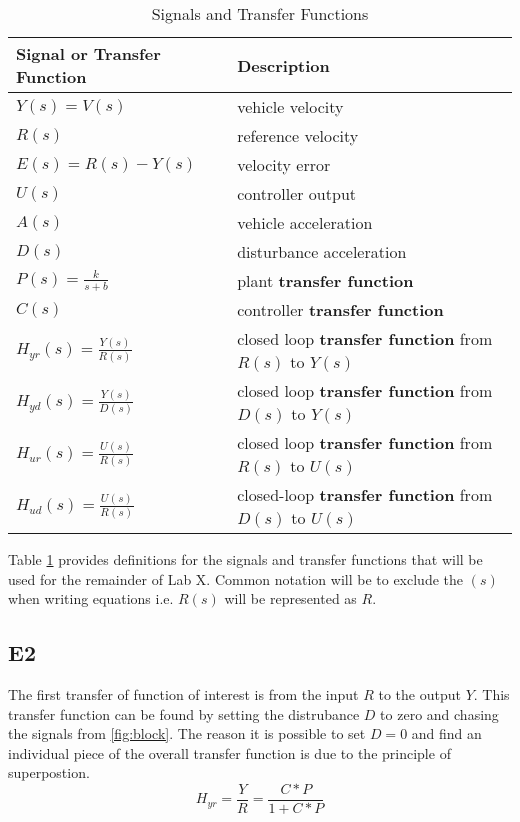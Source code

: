 \documentclass[11pt,titlepage]{article}
\begin{document}
	\begin{table}[!htb]
		\centering
		\begin{tabular}{|m{5cm}|m{9cm}|} 
		\hline
		Signal or Transfer Function & Description \\ 
		\hline
		$Y(s)=V(s)$ & vehicle velocity \\
		\hline
		$R(s)$ & reference velocity \\
		\hline
		$E(s)=R(s)-Y(s)$ & velocity error \\
		\hline
		$U(s)$ & controller output \\
		\hline
		$A(s)$ & vehicle acceleration \\
		\hline
		$D(s)$ & disturbance acceleration \\
		\hline 
		$P(s)=\frac{k}{s+b}$ & plant \textbf{transfer function} \\
		\hline 
		$C(s)$ & controller \textbf{transfer function} \\
		\hline 
		$H_{yr}(s)=\frac{Y(s)}{R(s)}$ & closed loop \textbf{transfer function} from $R(s)$ to $Y(s)$ \\
		\hline 
		$H_{yd}(s)=\frac{Y(s)}{D(s)}$ & closed loop \textbf{transfer function} from $D(s)$ to $Y(s)$ \\
		\hline 
		$H_{ur}(s)=\frac{U(s)}{R(s)}$ & closed loop \textbf{transfer function} from $R(s)$ to $U(s)$ \\
		\hline
		$H_{ud}(s)=\frac{U(s)}{R(s)}$ & closed-loop \textbf{transfer function} from $D(s)$ to $U(s)$ \\
		\hline
		\end{tabular}
		\caption{Signals and Transfer Functions} \label{table:SaTF}
		\end{table}

		\noindent Table \ref{table:SaTF} provides definitions for the signals and transfer functions that will be used for the remainder of Lab X. Common notation will be to exclude the $(s)$ when writing equations i.e. $R(s)$ will be represented as $R$.

	\subsection*{E2}
		The first transfer of function of interest is from the input $R$ to the output $Y$. This transfer function can be found by setting the distrubance $D$ to zero and chasing the signals from \ref{fig:block}. The reason it is possible to set $D=0$ and find an individual piece of the overall transfer function is due to the principle of superpostion.
		\begin{equation}
			H_{yr}=\frac{Y}{R}=\frac{C*P}{1+C*P}
		\end{equation}
	
\end{document}
